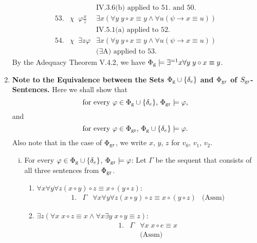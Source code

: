 \begin{enumerate}[1.]
\[\begin{array}{lll}
\   & \                                       & \mbox{IV.3.6(b) applied to 51. and 50.} \\
53. & \chi \;\; \varphi\frac{x}{z} & \exists x (\forall y \; y \circ x \equiv y \land \forall u (\psi \rightarrow x \equiv u)) \\
\   & \                                       & \mbox{IV.5.1(a) applied to 52.} \\
54. & \chi \;\; \exists z \varphi & \exists x (\forall y \; y \circ x \equiv y \land \forall u (\psi \rightarrow x \equiv u)) \\
\   & \                                       & \mbox{($\exists$A) applied to 53.}
\end{array}
\]
By the Adequacy Theorem V.4.2, we have $\Phi_{\mbox{\scriptsize g}} \models \exists^{=1}x \forall y \; y \circ x \equiv y$.
%
\item \textbf{Note to the Equivalence between the Sets $\Phi_{\mbox{\scriptsize g}} \cup \{ \delta_e \}$ and $\Phi_{\mbox{\scriptsize gr}}$ of $S_{\mbox{\scriptsize gr}}$-Sentences.} Here we shall show that
\[
\mbox{for every $\varphi \in \Phi_{\mbox{\scriptsize g}} \cup \{ \delta_e \}$, $\Phi_{\mbox{\scriptsize gr}} \models \varphi$,}
\]
and
\[
\mbox{for every $\varphi \in \Phi_{\mbox{\scriptsize gr}}$, $\Phi_{\mbox{\scriptsize g}} \cup \{ \delta_e \} \models \varphi$.}
\]
Also note that in the case of $\Phi_{\mbox{\scriptsize gr}}$, we write $x$, $y$, $z$ for $v_0$, $v_1$, $v_2$.
\\
\begin{enumerate}[(i)]
\item For every $\varphi \in \Phi_{\mbox{\scriptsize g}} \cup \{ \delta_e \}$, $\Phi_{\mbox{\scriptsize gr}} \models \varphi$: Let $\Gamma$ be the sequent that consists of all three sentences from $\Phi_{\mbox{\scriptsize gr}}$.
\begin{enumerate}
\item $\forall x \forall y \forall z (x \circ y) \circ z \equiv x \circ (y \circ z)$:
\[
\begin{array}{llll}
1. & \Gamma & \forall x \forall y \forall z (x \circ y) \circ z \equiv x \circ (y \circ z) & \mbox{(Assm)}
\end{array}
\]
\item $\exists z (\forall x \; x \circ z \equiv x \land \forall x \exists y \; x \circ y \equiv z)$:
\[
\begin{array}{lll}
1. & \Gamma & \forall x \; x \circ e \equiv x \\
\  & \      & \mbox{(Assm)} \\

\end{array}\]
\end{enumerate}
\end{enumerate}
\end{enumerate}
